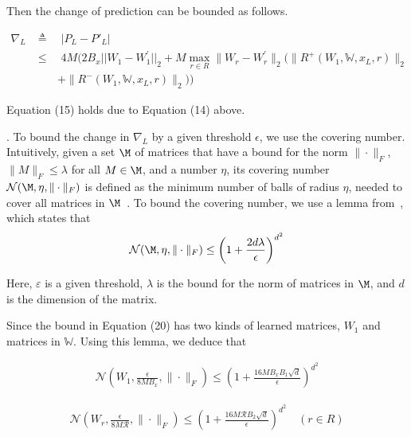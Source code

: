 Then the change of prediction can be bounded as follows.

\begin{scriptsize}
\begin{align*}
		\nabla_{L} & \triangleq \quad |P_L - P'_L|\\
&\leq \quad 4M \bigg(2B_{x}||W_{1}-W_{1}^{\prime}||_{2}+M\max_{r\in R}\|W_r-
W_r^{\prime}\|_2(\|R^+(W_1,\mathds{W},x_L,r)\|_2\\
&\quad\quad+\|R^-(W_1,\mathds{W},x_L,r)\|_2)\bigg)\tag{15}
\end{align*}
\end{scriptsize}

Equation (15) holds due to Equation (14) above.


.
To bound the change in $\nabla_{L}$ by 
a given threshold $\epsilon$, we use the covering number.
Intuitively, given a set $\M$ of matrices
that have a bound for the norm $\|\cdot\|_F$,
\ie $\|M\|_F\leq \lambda$ for all $M\in \M$,
and a number $\eta$, its covering 
number ${\mathcal N}(\M, \eta, \|\cdot\|_F)$ is defined as the minimum number
of balls of radius $\eta$, needed to cover
all matrices in $\M$~\cite{Covering-number}.
To bound the covering number, 
we use a lemma from~\cite{Covering-1}, 
which states that 
$${\mathcal N}(\M, \eta, \|\cdot\|_F)\leq \bigg(1+\frac{2d\lambda}{\epsilon}\bigg)^{d^2}$$

Here, $\varepsilon$ is a given threshold, $\lambda$
is the bound for the norm of matrices in $\M$, 
and $d$ is the dimension 
of the matrix.

Since the bound in Equation (20) has two kinds
of learned matrices, \ie $W_1$ and matrices in $\mathds{W}$.
Using this lemma, we deduce that 


\begin{align*}\mathcal{N}\left(W_{1},\frac{\epsilon}{8MB_{x}},\|\cdot\|_{F}\right)
\leq\left(1+\frac{16MB_{x}B_{1}\sqrt{d}}{\epsilon}\right)^{d^{2}}\end{align*}

\begin{align*}\mathcal{N}\left(W_r,\frac{\epsilon}{8M{\mathcal R}},
	\|\cdot\|_{F}\right)\leq\left(1+\frac{16M{\mathcal R}B_{2}\sqrt{d}}{\epsilon}
	\right)^{d^{2}} \quad (r\in R)
\end{align*}

